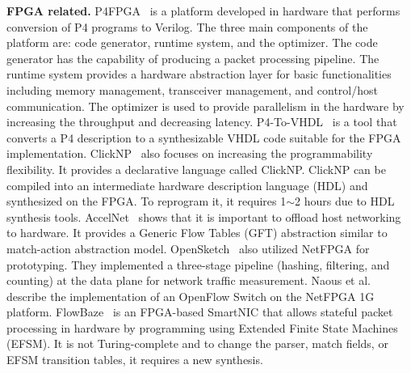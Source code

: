 \textbf{FPGA related.} P4FPGA~\cite{p4fpga} is a platform developed in hardware that performs conversion of P4 programs to Verilog.
The three main components of the platform are: code generator, runtime system, and the optimizer. The code generator has the capability of producing a packet processing pipeline. The runtime system provides a hardware abstraction layer for basic functionalities including memory management, transceiver management, and control/host communication. The optimizer is used to provide parallelism in the hardware by increasing the throughput and decreasing latency.
P4-To-VHDL~\cite{BENACEK201822} is a tool that converts a P4 description to a synthesizable VHDL code suitable for the FPGA implementation.
ClickNP~\cite{ClickNP2016} also focuses on increasing the programmability flexibility.
It provides a declarative language called ClickNP.
ClickNP can be compiled into an intermediate hardware description language (HDL) and synthesized on the FPGA.
To reprogram it, it requires 1$\sim$2 hours due to HDL synthesis tools.
AccelNet~\cite{AzureFPGA2018} shows that it is important to
offload host networking to hardware. It provides a Generic Flow Tables (GFT) abstraction similar to match-action abstraction model.
OpenSketch~\cite{Yu:2013:SDT:2482626.2482631} also utilized NetFPGA for prototyping. They implemented a three-stage pipeline (hashing, filtering, and counting) at the data plane for network traffic measurement. Naous et al.~\cite{Naous:2008:IOS:1477942.1477944} describe the implementation of an OpenFlow Switch on the NetFPGA 1G platform. 
FlowBaze~\cite{FlowBlaze2019} is an FPGA-based SmartNIC that allows stateful packet processing in hardware by programming using Extended Finite State Machines (EFSM). It is not Turing-complete and to change the parser, match fields, or EFSM transition tables, it requires a new synthesis.


